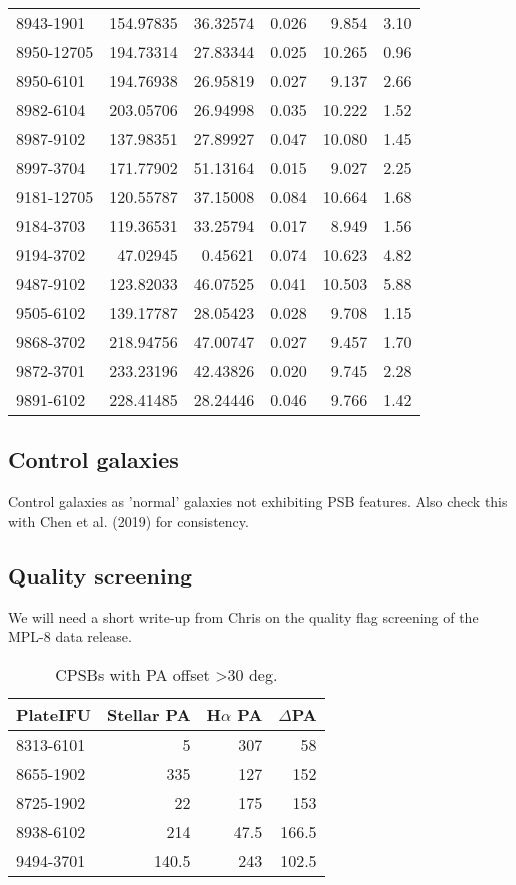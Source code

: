 \begin{table}
\begin{tabular}{lrrrrr}
8943-1901 & 154.97835 & 36.32574 & 0.026 & 9.854 & 3.10 \\
8950-12705 & 194.73314 & 27.83344 & 0.025 & 10.265 & 0.96 \\
8950-6101 & 194.76938 & 26.95819 & 0.027 & 9.137 & 2.66 \\
8982-6104 & 203.05706 & 26.94998 & 0.035 & 10.222 & 1.52 \\
8987-9102 & 137.98351 & 27.89927 & 0.047 & 10.080 & 1.45 \\
8997-3704 & 171.77902 & 51.13164 & 0.015 & 9.027 & 2.25 \\
9181-12705 & 120.55787 & 37.15008 & 0.084 & 10.664 & 1.68 \\
9184-3703 & 119.36531 & 33.25794 & 0.017 & 8.949 & 1.56 \\
9194-3702 & 47.02945 & 0.45621 & 0.074 & 10.623 & 4.82 \\
9487-9102 & 123.82033 & 46.07525 & 0.041 & 10.503 & 5.88 \\
9505-6102 & 139.17787 & 28.05423 & 0.028 & 9.708 & 1.15 \\
9868-3702 & 218.94756 & 47.00747 & 0.027 & 9.457 & 1.70 \\
9872-3701 & 233.23196 & 42.43826 & 0.020 & 9.745 & 2.28 \\
9891-6102 & 228.41485 & 28.24446 & 0.046 & 9.766 & 1.42 \\
\hline
\end{tabular}
\end{table}

\subsection{Control galaxies}
Control galaxies as 'normal' galaxies not exhibiting PSB features. Also check this with Chen et al. (2019) for consistency.

\subsection{Quality screening}
We will need a short write-up from Chris on the quality flag screening of the MPL-8 data release.


\begin{table}
\caption{CPSBs with PA offset \textgreater 30 deg.}
\label{tab:offsetCPSBs}
\begin{tabular}{lrrr}
\hline
PlateIFU  & Stellar PA & H$\alpha$ PA & $\Delta$PA \\
\hline
8313-6101 & 5 & 307 & 58 \\
8655-1902 & 335 & 127 & 152 \\
8725-1902 & 22 & 175 & 153 \\
8938-6102 & 214 & 47.5 & 166.5 \\
9494-3701 & 140.5 & 243 & 102.5 \\
\hline
\end{tabular}
\end{table}

